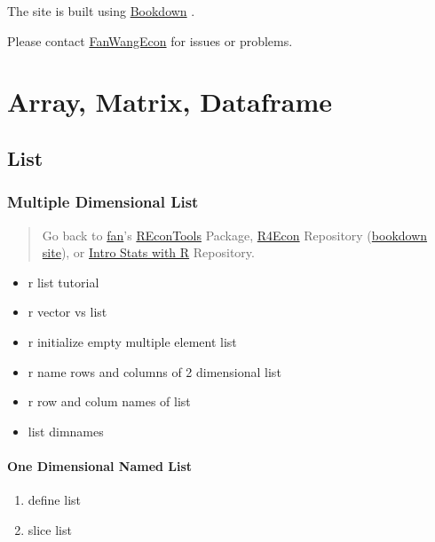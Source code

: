 \documentclass[
]{book}
\providecommand{\tightlist}{%
  \setlength{\itemsep}{0pt}\setlength{\parskip}{0pt}}
\begin{document}
The site is built using \href{https://bookdown.org/}{Bookdown} \citep{R-bookdown}.

Please contact \href{https://fanwangecon.github.io/}{FanWangEcon} for issues or problems.

\hypertarget{array-matrix-dataframe}{%
\chapter{Array, Matrix, Dataframe}\label{array-matrix-dataframe}}

\hypertarget{list}{%
\section{List}\label{list}}

\hypertarget{multiple-dimensional-list}{%
\subsection{Multiple Dimensional List}\label{multiple-dimensional-list}}

\begin{quote}
Go back to \href{http://fanwangecon.github.io/}{fan}'s \href{https://fanwangecon.github.io/REconTools/}{REconTools} Package, \href{https://fanwangecon.github.io/R4Econ/}{R4Econ} Repository (\href{https://fanwangecon.github.io/R4Econ/bookdown}{bookdown site}), or \href{https://fanwangecon.github.io/Stat4Econ/}{Intro Stats with R} Repository.
\end{quote}

\begin{itemize}
\tightlist
\item
  r list tutorial
\item
  r vector vs list
\item
  r initialize empty multiple element list
\item
  r name rows and columns of 2 dimensional list
\item
  r row and colum names of list
\item
  list dimnames
\end{itemize}

\hypertarget{one-dimensional-named-list}{%
\subsubsection{One Dimensional Named List}\label{one-dimensional-named-list}}

\begin{enumerate}
\def\labelenumi{\arabic{enumi}.}
\tightlist
\item
  define list
\item
  slice list
\end{enumerate}
\end{document}
